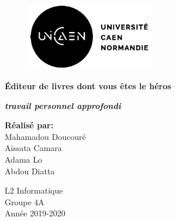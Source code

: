 \documentclass[12pt,a4paper]{article}
\begin{document}
\begin{titlepage}
\begin{flushright}
\end{flushright}

\begin{figure}[ht]
  \begin{flushleft}
    \includegraphics[width=0.5\textwidth]{./images/unicaen.png} 
  \end{flushleft}
\end{figure}


\parindent=0pt

\hrulefill
\begin{center}\bfseries\Huge
   Éditeur de livres dont vous êtes le héros
    	
\end{center}
\hrulefill





\begin{flushright}\bfseries\Large
\textit{\Large travail personnel approfondi}
\end{flushright}

\vspace*{2cm}


\begin{small}
 \textbf{Réalisé par:}\\
 Mahamadou Doucouré\\
Aissata Camara\\
Adama Lo\\
 Abdou Diatta\\
\end{small} 

\begin{flushright}
      L2 Informatique\\
      Groupe 4A\\
      Année 2019-2020\\
\end{flushright}   
\end{titlepage}
\end{document}
